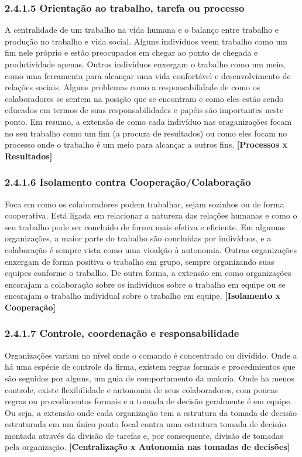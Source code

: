     \subsubsection{2.4.1.5 Orientação ao trabalho, tarefa ou processo}
    A centralidade de um trabalho na vida humana e o balanço entre trabalho e produção no trabalho e vida social. Alguns indivíduos veem trabalho como um fim nele próprio e estão preocupados em chegar ao ponto de chegada e produtividade apenas. Outros indivíduos enxergam o trabalho como um meio, como uma ferramenta para alcançar uma vida confortável e desenvolvimento de relações sociais. Alguns problemas como a responsabilidade de como os colaboradores se sentem na posição que se encontram e como eles estão sendo educados em termos de suas responsabilidades e papéis são importantes neste ponto. Em resumo, a extensão de como cada indivíduo nas oraganizações focam no seu trabalho como um fim (a procura de resultados) ou como eles focam no processo onde o trabalho é um meio para alcançar a outros fins. {\bf [Processos x Resultados]}

    \subsubsection{2.4.1.6 Isolamento contra Cooperação/Colaboração}
    Foca em como os colaboradores podem trabalhar, sejam sozinhos ou de forma cooperativa. Está ligada em relacionar a natureza das relações humanas e como o seu trabalho pode ser concluido de forma mais efetiva e eficiente. Em algumas organizações, a maior parte do trabalho são concluidas por indivíduos, e a colaboração é sempre vista como uma vioalção à autonomia. Outras organizações enxergam de forma positiva o trabalho em grupo, sempre organizando suas equipes conforme o trabalho. De outra forma, a extensão em como organizações encorajam a colaboração sobre os indivíduos sobre o trabalho em equipe ou se encorajam o trabalho individual sobre o trabalho em equipe. {\bf [Isolamento x Cooperação]}
    
    \subsubsection{2.4.1.7 Controle, coordenação e responsabilidade}
    Organizações variam no nível onde o comando é concentrado ou dividido. Onde a há uma espécie de controle da firma, existem regras formais e procedmientos que são seguidos por alguns, um guia de comportamento da maioria. Onde ha menos controle, existe flexibilidade e autonomia de seus colaboradores, com poucas regras ou procedimentos formais e a tomada de decisão geralmente é em equipe. Ou seja, a extensão onde cada organização tem a estrutura da tomada de decisão estruturada em um único ponto focal contra uma estrutura tomada de decisão montada através da divisão de tarefas e, por consequente, divisão de tomadas pela organização. {\bf [Centralização x Autonomia nas tomadas de decisões]}
    
